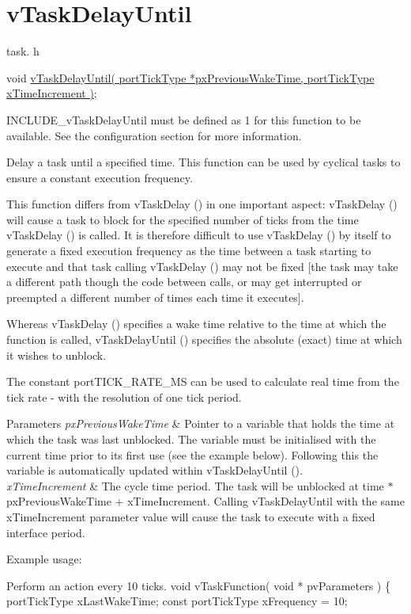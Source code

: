 \hypertarget{group__v_task_delay_until}{\section{v\-Task\-Delay\-Until}
\label{group__v_task_delay_until}
}
task. h 
\begin{DoxyPre}void \hyperlink{tasks_8c_aa0aef01343148471ad053924cfd37901}{vTaskDelayUntil( portTickType *pxPreviousWakeTime, portTickType xTimeIncrement )};\end{DoxyPre}


I\-N\-C\-L\-U\-D\-E\-\_\-v\-Task\-Delay\-Until must be defined as 1 for this function to be available. See the configuration section for more information.

Delay a task until a specified time. This function can be used by cyclical tasks to ensure a constant execution frequency.

This function differs from v\-Task\-Delay () in one important aspect\-: v\-Task\-Delay () will cause a task to block for the specified number of ticks from the time v\-Task\-Delay () is called. It is therefore difficult to use v\-Task\-Delay () by itself to generate a fixed execution frequency as the time between a task starting to execute and that task calling v\-Task\-Delay () may not be fixed \mbox{[}the task may take a different path though the code between calls, or may get interrupted or preempted a different number of times each time it executes\mbox{]}.

Whereas v\-Task\-Delay () specifies a wake time relative to the time at which the function is called, v\-Task\-Delay\-Until () specifies the absolute (exact) time at which it wishes to unblock.

The constant port\-T\-I\-C\-K\-\_\-\-R\-A\-T\-E\-\_\-\-M\-S can be used to calculate real time from the tick rate -\/ with the resolution of one tick period.


\begin{DoxyParams}{Parameters}
{\em px\-Previous\-Wake\-Time} & Pointer to a variable that holds the time at which the task was last unblocked. The variable must be initialised with the current time prior to its first use (see the example below). Following this the variable is automatically updated within v\-Task\-Delay\-Until ().\\
\hline
{\em x\-Time\-Increment} & The cycle time period. The task will be unblocked at time $\ast$px\-Previous\-Wake\-Time + x\-Time\-Increment. Calling v\-Task\-Delay\-Until with the same x\-Time\-Increment parameter value will cause the task to execute with a fixed interface period.\\
\hline
\end{DoxyParams}
Example usage\-: 
\begin{DoxyPre}
Perform an action every 10 ticks.
 void vTaskFunction( void * pvParameters )
 \{
 portTickType xLastWakeTime;
 const portTickType xFrequency = 10;\end{DoxyPre}




